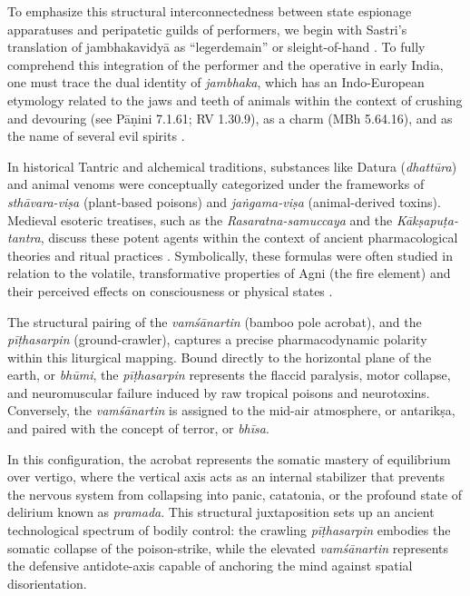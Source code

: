 \documentclass[11pt,twoside,letterpaper]{article}
\begin{document}
To emphasize this structural interconnectedness between state espionage apparatuses and peripatetic guilds of performers, we begin with Sastri's translation of jambhakavidyā as ``legerdemain'' or sleight-of-hand \citep{shamasastri1929}. To fully comprehend this integration of the performer and the operative in early India, one must trace the dual identity of \textit{jambhaka}, which has an Indo-European etymology related to the jaws and teeth of animals within the context of crushing and devouring (see Pāṇini 7.1.61; RV 1.30.9), as a charm (MBh 5.64.16), and as the name of several evil spirits \citep{narten1965}. 

In historical Tantric and alchemical traditions, substances like Datura (\textit{dhattūra}) and animal venoms were conceptually categorized under the frameworks of \textit{sthāvara-viṣa} (plant-based poisons) and \textit{jaṅgama-viṣa} (animal-derived toxins). Medieval esoteric treatises, such as the \textit{Rasaratna-samuccaya} and the \textit{Kākṣapuṭa-tantra}, discuss these potent agents within the context of ancient pharmacological theories and ritual practices \citep{wujastyk2003roots, white1996alchemical}. Symbolically, these formulas were often studied in relation to the volatile, transformative properties of Agni (the fire element) and their perceived effects on consciousness or physical states \citep{svoboda1993aghora}.

The structural pairing of the \textit{vamśānartin} (bamboo pole acrobat), and the \textit{pīṭhasarpin} (ground-crawler), captures a precise pharmacodynamic polarity within this liturgical mapping. Bound directly to the horizontal plane of the earth, or \textit{bhūmi}, the \textit{pīṭhasarpin} represents the flaccid paralysis, motor collapse, and neuromuscular failure induced by raw tropical poisons and neurotoxins. Conversely, the \textit{vamśānartin} is assigned to the mid-air atmosphere, or antarikṣa, and paired with the concept of terror, or \textit{bhīsa}. 

In this configuration, the acrobat represents the somatic mastery of equilibrium over vertigo, where the vertical axis acts as an internal stabilizer that prevents the nervous system from collapsing into panic, catatonia, or the profound state of delirium known as \textit{pramada}. This structural juxtaposition sets up an ancient technological spectrum of bodily control: the crawling \textit{pīṭhasarpin} embodies the somatic collapse of the poison-strike, while the elevated \textit{vamśānartin} represents the defensive antidote-axis capable of anchoring the mind against spatial disorientation.
\end{document}
